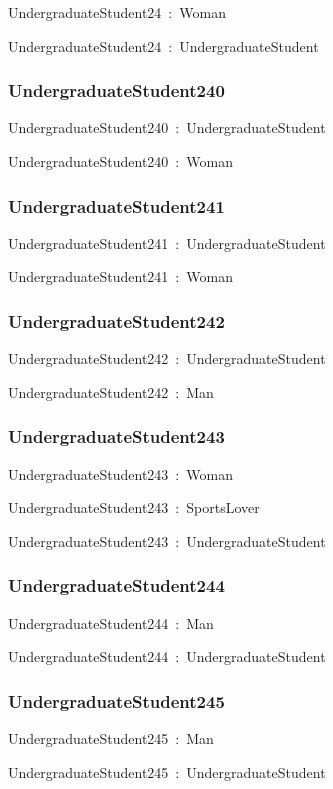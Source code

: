 \documentclass{article}
\begin{document}
UndergraduateStudent24~:~Woman

UndergraduateStudent24~:~UndergraduateStudent

\subsubsection*{UndergraduateStudent240}

UndergraduateStudent240~:~UndergraduateStudent

UndergraduateStudent240~:~Woman

\subsubsection*{UndergraduateStudent241}

UndergraduateStudent241~:~UndergraduateStudent

UndergraduateStudent241~:~Woman

\subsubsection*{UndergraduateStudent242}

UndergraduateStudent242~:~UndergraduateStudent

UndergraduateStudent242~:~Man

\subsubsection*{UndergraduateStudent243}

UndergraduateStudent243~:~Woman

UndergraduateStudent243~:~SportsLover

UndergraduateStudent243~:~UndergraduateStudent

\subsubsection*{UndergraduateStudent244}

UndergraduateStudent244~:~Man

UndergraduateStudent244~:~UndergraduateStudent

\subsubsection*{UndergraduateStudent245}

UndergraduateStudent245~:~Man

UndergraduateStudent245~:~UndergraduateStudent
\end{document}
